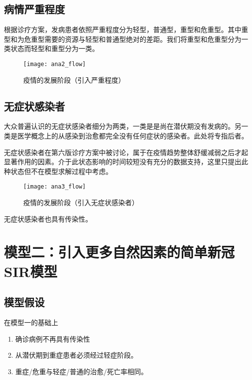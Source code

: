 \documentclass[withoutpreface,bwprint]{cumcmthesis} %
\begin{document}
\subsection{病情严重程度}
根据诊疗方案，发病患者依照严重程度分为轻型，普通型，重型和危重型。其中重型和为危重型需要的资源与轻型和普通型绝对的差距。我们将重型和危重型分为一类状态而轻型和重型分为一类。
    \begin{figure}[!h]
        \centering
        \texttt{[image: ana2\_flow]}
        \caption{疫情的发展阶段（引入严重程度）}
        \label{fig:ana2_flow}
    \end{figure}

\subsection{无症状感染者}
大众普遍认识的无症状感染者细分为两类，一类是是尚在潜伏期没有发病的。另一类是医学概念上的从感染到治愈都完全没有任何症状的感染者。此处将专指后者。

无症状感染者在第六版诊疗方案中被讨论，属于在疫情趋势整体舒缓减弱之后才起显著作用的因素。介于此状态影响的时间较短没有充分的数据支持，这里只提出此种状态但不在模型求解过程中考虑。
    \begin{figure}[!h]
        \centering
        \texttt{[image: ana3\_flow]}
        \caption{疫情的发展阶段（引入无症状感染者）}
        \label{fig:ana3_flow}
    \end{figure}
无症状感染者也具有传染性。

\section{模型二：引入更多自然因素的简单新冠SIR模型}
\subsection{模型假设}
在模型一的基础上
    \begin{enumerate}
        \item 确诊病例不再具有传染性
        \item 从潜伏期到重症患者必须经过轻症阶段。
        \item 重症/危重与轻症/普通的治愈/死亡率相同。
    \end{enumerate}
\newpage
\end{document}
